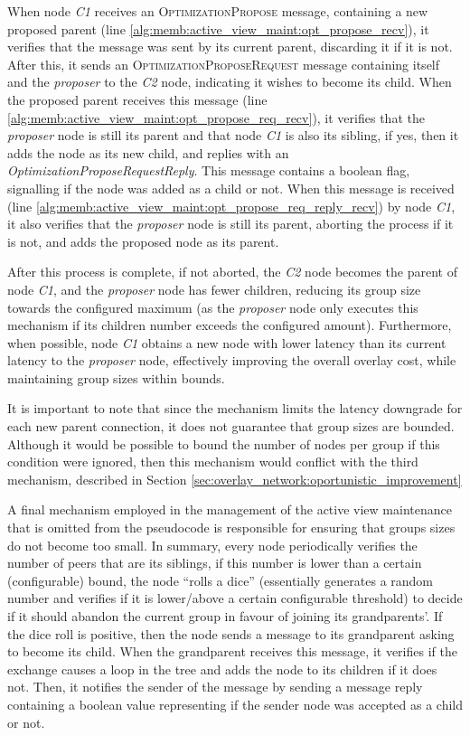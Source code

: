 When node \textit{C1} receives an \textsc{OptimizationPropose} message, containing a new proposed parent (line \ref{alg:memb:active_view_maint:opt_propose_recv}), it verifies that the message was sent by its current parent, discarding it if it is not. After this, it sends an \textsc{OptimizationProposeRequest} message containing itself and the \textit{proposer} to the \textit{C2} node, indicating it wishes to become its child. When the proposed parent receives this message (line \ref{alg:memb:active_view_maint:opt_propose_req_recv}), it verifies that the \textit{proposer} node is still its parent and that node \textit{C1} is also its sibling, if yes, then it adds the node as its new child, and replies with an \textit{OptimizationProposeRequestReply}. This message contains a boolean flag, signalling if the node was added as a child or not. When this message is received (line \ref{alg:memb:active_view_maint:opt_propose_req_reply_recv}) by node \textit{C1}, it also verifies that the \textit{proposer} node is still its parent, aborting the process if it is not, and adds the proposed node as its parent.

After this process is complete, if not aborted, the \textit{C2} node becomes the parent of node \textit{C1}, and the \textit{proposer} node has fewer children, reducing its group size towards the configured maximum (as the \textit{proposer} node only executes this mechanism if its children number exceeds the configured amount). Furthermore, when possible, node \textit{C1} obtains a new node with lower latency than its current latency to the \textit{proposer} node, effectively improving the overall overlay cost, while maintaining group sizes within bounds.

It is important to note that since the mechanism limits the latency downgrade for each new parent connection, it does not guarantee that group sizes are bounded. Although it would be possible to bound the number of nodes per group if this condition were ignored, then this mechanism would conflict with the third mechanism, described in Section \ref{sec:overlay_network:oportunistic_improvement}

A final mechanism employed in the management of the active view maintenance that is omitted from the pseudocode is responsible for ensuring that groups sizes do not become too small. In summary, every node periodically verifies the number of peers that are its siblings, if this number is lower than a certain (configurable) bound, the node ``rolls a dice'' (essentially generates a random number and verifies if it is lower/above a certain configurable threshold) to decide if it should abandon the current group in favour of joining its grandparents'. If the dice roll is positive, then the node sends a message to its grandparent asking to become its child. When the grandparent receives this message, it verifies if the exchange causes a loop in the tree and adds the node to its children if it does not. Then, it notifies the sender of the message by sending a message reply containing a boolean value representing if the sender node was accepted as a child or not. 

